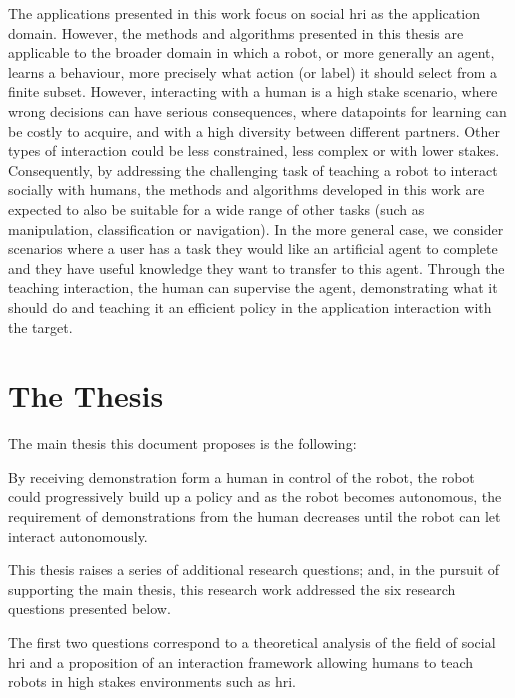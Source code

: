 The applications presented in this work focus on social \gls{hri} as the application domain. However, the methods and algorithms presented in this thesis are applicable to the broader domain in which a robot, or more generally an agent, learns a behaviour, more precisely what action (or label) it should select from a finite subset. However, interacting with a human is a high stake scenario, where wrong decisions can have serious consequences, where datapoints for learning can be costly to acquire, and with a high diversity between different partners. Other types of interaction could be less constrained, less complex or with lower stakes. Consequently, by addressing the challenging task of teaching a robot to interact socially with humans, the methods and algorithms developed in this work are expected to also be suitable for a wide range of other tasks (such as manipulation, classification or navigation). In the more general case, we consider scenarios where a user has a task they would like an artificial agent to complete and they have useful knowledge they want to transfer to this agent. Through the teaching interaction, the human can supervise the agent, demonstrating what it should do and teaching it an efficient policy in the application interaction with the target. 

\section{The Thesis}\label{sec:intro_thesis}

The main thesis this document proposes is the following:
\begin{quote}
	\textbf{\thesis}
\end{quote}

By receiving demonstration form a human in control of the robot, the robot could progressively build up a policy and as the robot becomes autonomous, the requirement of demonstrations from the human decreases until the robot can let interact autonomously.

This thesis raises a series of additional research questions; and, in the pursuit of supporting the main thesis, this research work addressed the six research questions presented below.

The first two questions correspond to a theoretical analysis of the field of social \gls{hri} and a proposition of an interaction framework allowing humans to teach robots in high stakes environments such as \gls{hri}.


